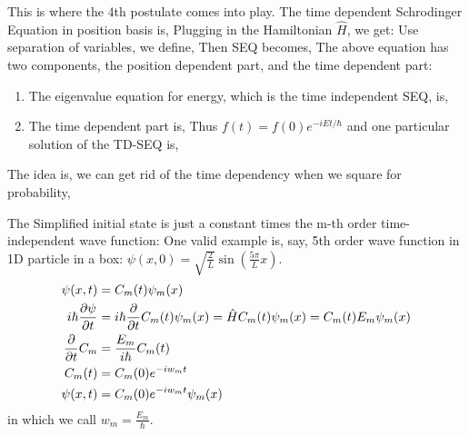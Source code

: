 \documentclass{school-22.101-notes}
\date{October 3, 2011}
\begin{document}
\maketitle

This is where the 4th postulate comes into play. The time dependent Schrodinger Equation in position basis is, 
Plugging in the Hamiltonian $\hat{H}$, we get: 
Use separation of variables, we define, 
Then SEQ becomes, 
The above equation has two components, the position dependent part, and the time dependent part: 
\begin{enumerate}
\item The eigenvalue equation for energy, which is the time independent SEQ, is, 
\item The time dependent part is, 
  Thus $f(t) = f(0) e^{-iEt/\hbar}$ and one particular solution of the TD-SEQ is, 
\end{enumerate}





The idea is, we can get rid of the time dependency when we square for probability, 


The Simplified initial state is just a constant times the m-th order time-independent wave function:
One valid example is, say, 5th order wave function in 1D particle in a box: $\psi(x,0) = \sqrt{\frac{2}{L}} \sin \left( \frac{5 \pi}{L} x\right).$
\begin{align}
\psi(x,t) &= C_m(t) \psi_m(x) \\
i \hbar \frac{\partial \psi}{\partial t} &= i \hbar \frac{\partial}{\partial t} C_m (t) \psi_m (x) = \hat{H} C_m (t) \psi_m (x) = C_m (t) E_m \psi_m (x) \\
\frac{\partial}{\partial t} C_m &= \frac{E_m}{i\hbar} C_m (t) \\
C_m (t) &= C_m(0) e^{-i w_m t} \\
\psi(x,t) &= C_m(0) e^{-i w_m t} \psi_m (x) 
\end{align}
in which we call $w_m = \frac{E_m}{\hbar}$. 
\end{document}
